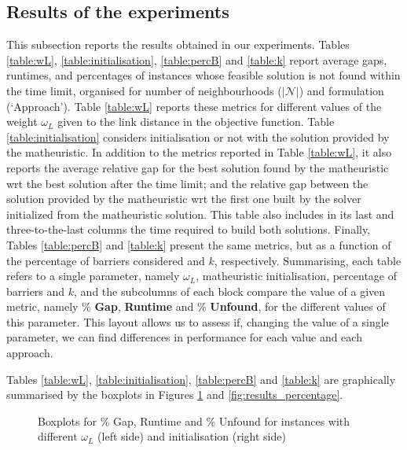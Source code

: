 \documentclass[a4paper,  review, authoryear, 1p.]{elsarticle}
\newcommand{\JP}[1]{{\color{blue}#1}}
\begin{document}
		\subsection{Results of the experiments}
		\JP{This subsection reports the results obtained in our experiments.
		Tables \ref{table:wL}, \ref{table:initialisation}, \ref{table:percB}  and \ref{table:k} report average gaps, runtimes, and percentages of instances whose feasible solution is not found within the time limit, organised for number of neighbourhoods ($| \mathcal{N}|$)  and formulation (`Approach'). Table \ref{table:wL} reports these metrics for different values of the weight $\omega_L$ given to the link distance in the objective function.  Table  \ref{table:initialisation}  considers initialisation or not with the solution provided by the matheuristic. In addition to the metrics reported in Table \ref{table:wL}, it also reports the average relative gap for the best solution found by the matheuristic wrt the best solution after the time limit; and the relative gap between the solution provided by the matheuristic wrt the first one built by the solver initialized from the matheuristic solution. This table also includes in its last and three-to-the-last columns the time required  to build both solutions. Finally, Tables \ref{table:percB} and \ref{table:k}  present the same metrics, but as a function of the percentage of barriers considered and $k$, respectively. Summarising, each table refers to a single parameter, namely $\omega_L$, matheuristic initialisation, percentage of barriers and $k$, and the subcolumns of each block  compare the value of a given metric, namely $\%$ \textbf{Gap}, \textbf{Runtime} and $\%$ \textbf{Unfound}, for the different values of  this parameter. This layout allows us to assess if, changing the value of a single parameter, we can find differences in performance for each value and each approach. }

		
		
		
		
		
		\JP{
		Tables  \ref{table:wL}, \ref{table:initialisation}, \ref{table:percB} and \ref{table:k} are graphically summarised by the boxplots in Figures \ref{fig:results_wL} and \ref{fig:results_percentage}}.

		\begin{figure}[h!]
			\centering
			\caption{Boxplots for \% Gap, Runtime and \% Unfound for instances with different $\omega_L$ (left side) and initialisation (right side)}
			
			\label{fig:results_wL}
			
		\end{figure}
\end{document}
